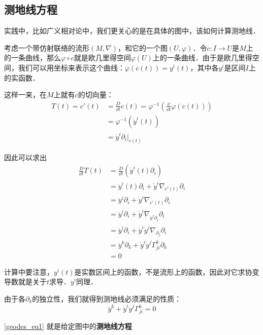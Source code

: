 \subsection{测地线方程}

实践中，比如广义相对论中，我们更关心的是在具体的图中，该如何计算测地线．

考虑一个带仿射联络的流形$(M, \nabla)$，和它的一个图$(U, \varphi)$．令$c:I\to U$是$M$上的一条曲线，那么$\varphi\circ c$就是欧几里得空间$\varphi(U)$上的一条曲线．由于是欧几里得空间，我们可以用坐标来表示这个曲线：$\varphi(c(t))=y^i(t)$，其中各$y^i$是区间$I$上的实函数．


这样一来，在$M$上就有$c$的切向量：
\begin{equation}
\begin{aligned}
T(t)=c'(t)&=\frac{D}{\dd t}c(t)=\varphi^{-1}(\frac{\dd}{\dd t}\varphi(c(t)))\\
&=\varphi^{-1}(\dot{y}^i(t))\\
&=\dot{y}^i\partial_i|_{c(t)}
\end{aligned}
\end{equation}

因此可以求出
\begin{equation}
\begin{aligned}
\frac{D}{\dd t}T(t)&=\frac{D}{\dd t}(\dot{y}^i(t)\partial_i)\\
&=\ddot{y}^i(t)\partial_i+\dot{y}^i\nabla_{c'(t)}\partial_i\\
&=\ddot{y}^i\partial_i+\dot{y}^i\nabla_{c'(t)}\partial_i\\
&=\ddot{y}^i\partial_i+\dot{y}^i\nabla_{\dot{y}^j\partial_j}\partial_i\\
&=\ddot{y}^i\partial_i+\dot{y}^i\dot{y}^j\nabla_{\partial_j}\partial_i\\
&=\ddot{y}^k\partial_k+\dot{y}^i\dot{y}^j\Gamma^k_{ji}\partial_k\\
&=0
\end{aligned}
\end{equation}

计算中要注意，$y^i(t)$是实数区间上的函数，不是流形上的函数，因此对它求协变导数就是关于$t$求导．$\dot{y}^i$同理．

由于各$\partial_k$的独立性，我们就得到测地线必须满足的性质：
\begin{equation}\label{geodes_eq1}
\ddot{y}^k+\dot{y}^i\dot{y}^j\Gamma^k_{ji}=0
\end{equation}

\autoref{geodes_eq1} 就是给定图中的\textbf{测地线方程}


